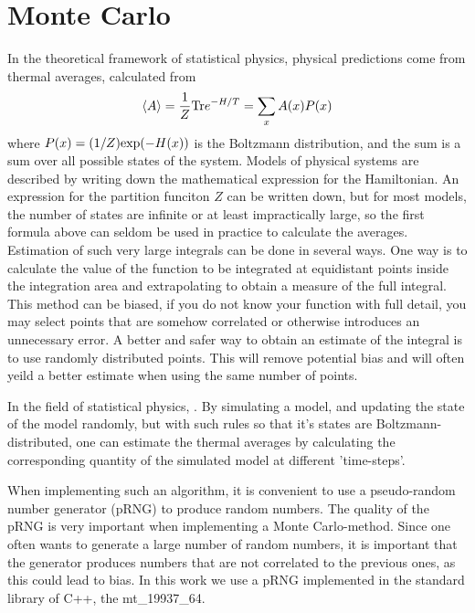 %

\section{Monte Carlo}
In the theoretical framework of statistical physics, physical predictions come from thermal averages, calculated from 
\begin{equation}
  \langle A\rangle = \frac{1}{Z}\textrm{Tr} e^{-H/T} = \sum_x A(x) P(x)
  \label{MC:eq:avg}
\end{equation}
where  $P(x) = (1/Z)\textrm{exp}(-H(x))$ is the Boltzmann distribution, and the sum is a sum over all possible states of the system. 
Models of physical systems are described by writing down the mathematical expression for the Hamiltonian.
An expression for the partition funciton $Z$ can be written down, but for most models, the number of states are infinite or at least impractically large, so the first formula above can seldom be used in practice to calculate the averages.
Estimation of such very large integrals can be done in several ways.
One way is to calculate the value of the function to be integrated at equidistant points inside the integration area and extrapolating to obtain a measure of the full integral.
This method can be biased, if you do not know your function with full detail, you may select points that are somehow correlated or otherwise introduces an unnecessary error.
A better and safer way to obtain an estimate of the integral is to use randomly distributed points.
This will remove potential bias and will often yeild a better estimate when using the same number of points.

In the field of statistical physics, . By simulating a model, and updating the state of the model randomly, but with such rules so that it's states are Boltzmann-distributed, one can estimate the thermal averages by calculating the corresponding quantity of the simulated model at different 'time-steps'.

When implementing such an algorithm, it is convenient to use a pseudo-random number generator (pRNG) to produce random numbers.
The quality of the pRNG is very important when implementing a Monte Carlo-method.
Since one often wants to generate a large number of random numbers, it is important that the generator produces numbers that are not correlated to the previous ones, as this could lead to bias. 
In this work we use a pRNG implemented in the standard library of C++, the mt\_19937\_64.

